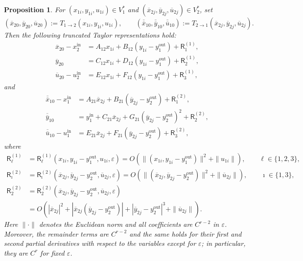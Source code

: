 \documentclass[11pt,a4paper]{article}
\theoremstyle{plain}
\newtheorem{proposition}[theorem]{Proposition}%
\theoremstyle{definition}
\theoremstyle{plain}
\numberwithin{equation}{section}
\begin{document}
\begin{proposition}
\label{prop-globalrepr}
For $(x_{1i},y_{1i},u_{1i}) \in V_1^*$ and $(\overline{x}_{2j},\overline{y}_{2j},\overline{u}_{2j}) \in V_2^*$, set
\[
(\overline{x}_{20},\overline{y}_{20},\overline{u}_{20})
:=
T_{1 \to 2}(x_{1i},y_{1i},u_{1i}),
\qquad
(\overline{\overline{x}}_{10},\overline{\overline{y}}_{10},\overline{\overline{u}}_{10})
:=
T_{2 \to 1}(\overline{x}_{2j},\overline{y}_{2j},\overline{u}_{2j}).
\]
Then the following truncated Taylor representations hold:
\begin{equation}
\label{eq-T1to2}
\begin{aligned}
\overline{x}_{20} - x_2^\mathrm{in}
&=
A_{12} x_{1i}
+
B_{12}(y_{1i} - y_1^\mathrm{out})
+
\mathsf{R}^{(1)}_1, \\
\overline{y}_{20}
&=
C_{12} x_{1i}
+
D_{12}(y_{1i} - y_1^\mathrm{out})
+
\mathsf{R}^{(1)}_2, \\
\overline{u}_{20} - u_2^\mathrm{in}
&=
E_{12} x_{1i}
+
F_{12}(y_{1i} - y_1^\mathrm{out})
+
\mathsf{R}^{(1)}_3,
\end{aligned}
\end{equation}
and
\begin{equation}
\label{eq-T2to1}
\begin{aligned}
\overline{\overline{x}}_{10} - x_1^\mathrm{in}
&=
A_{21}\overline{x}_{2j}
+
B_{21}(\overline{y}_{2j} - y_2^\mathrm{out})
+
\mathsf{R}^{(2)}_1, \\
\overline{\overline{y}}_{10}
&=
y_1^\mathrm{in}
+
C_{21}\overline{x}_{2j}
+
G_{21}(\overline{y}_{2j} - y_2^\mathrm{out})^2
+
\mathsf{R}^{(2)}_2, \\
\overline{\overline{u}}_{10} - u_1^\mathrm{in}
&=
E_{21}\overline{x}_{2j}
+
F_{21}(\overline{y}_{2j} - y_2^\mathrm{out})
+
\mathsf{R}^{(2)}_3,
\end{aligned}
\end{equation}
where
\begin{align*}
\mathsf{R}^{(1)}_\ell
&=
\mathsf{R}^{(1)}_\ell(x_{1i},y_{1i} - y_1^\mathrm{out},u_{1i},\varepsilon)
=
O\!\left(\|(x_{1i},y_{1i} - y_1^\mathrm{out})\|^2 + \|u_{1i}\|\right),
\qquad
\ell \in \{1,2,3\}, \\
\mathsf{R}^{(2)}_\imath
&=
\mathsf{R}^{(2)}_\imath(\overline{x}_{2j},\overline{y}_{2j} - y_2^\mathrm{out},\overline{u}_{2j},\varepsilon)
=
O\!\left(\|(\overline{x}_{2j},\overline{y}_{2j} - y_2^\mathrm{out})\|^2 + \|\overline{u}_{2j}\|\right),
\qquad
\imath \in \{1,3\}, \\
\mathsf{R}^{(2)}_2
&=
\mathsf{R}^{(2)}_2(\overline{x}_{2j},\overline{y}_{2j} - y_2^\mathrm{out},\overline{u}_{2j},\varepsilon) \\
&=
O\!\left(
|\overline{x}_{2j}|^2
+
|\overline{x}_{2j}(\overline{y}_{2j} - y_2^\mathrm{out})|
+
|\overline{y}_{2j} - y_2^\mathrm{out}|^3
+
\|\overline{u}_{2j}\|
\right).
\end{align*}
Here $\|\cdot\|$ denotes the Euclidean norm and all coefficients are $C^{r-2}$ in $\varepsilon$. Moreover, the remainder terms are $C^{r-2}$ and the same holds for their first and second partial derivatives with respect to the variables except for $\varepsilon$; in particular, they are $C^r$ for fixed $\varepsilon$.
\end{proposition}
\end{document}
